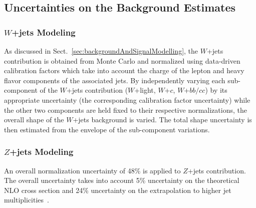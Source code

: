 \subsection{Uncertainties on the Background Estimates}
\label{sec:syst_norm}

\subsubsection{$W$+jets Modeling}
\label{sec:syst_vjetsnorm}
As discussed in Sect.~\ref{sec:backgroundAndSignalModelling}, the $W$+jets contribution is
obtained from Monte Carlo and normalized using data-driven calibration factors which take into account the charge of the lepton
and heavy flavor components of the associated jets. By independently varying each sub-component of the $W$+jets contribution ($W$+light, $W$+$c$, $W$+$bb/cc$) by its appropriate uncertainty (the corresponding calibration factor uncertainty) while the other two components are held fixed to their respective normalizations, the overall shape of the $W$+jets background is varied. The total shape uncertainty is then estimated from the envelope of the sub-component variations.

\subsubsection{$Z$+jets Modeling}
\label{sec:syst_zjetsnorm}
An overall normalization uncertainty of 48\% is applied to $Z$+jets contribution.
The overall uncertainty takes into account 5\% uncertainty
on the theoretical NLO cross section and 24\% uncertainty on the extrapolation to
higher jet multiplicities~\cite{wjetsnote}. %



